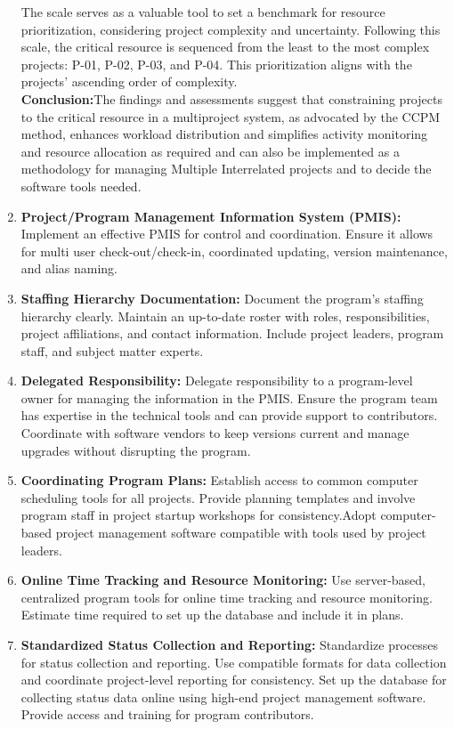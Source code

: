 \documentclass{llncs}
\begin{document}
\begin{enumerate}
\begin{figure}
                    \end{figure}
    The scale serves as a valuable tool to set a benchmark for resource prioritization, considering project complexity and uncertainty. Following this scale, the critical resource is sequenced from the least to the most complex projects: P-01, P-02, P-03, and P-04. This prioritization aligns with the projects' ascending order of complexity.~\cite{refpaper7} \\
    \textbf{Conclusion:}The findings and assessments suggest that constraining projects to the critical resource in a multiproject system, as advocated by the CCPM method, enhances workload distribution and simplifies activity monitoring and resource allocation as required and can also be implemented as a methodology for managing Multiple Interrelated projects and to decide the software tools needed.~\cite{refpaper7}
    \item\textbf{Project/Program Management Information System (PMIS):}
    Implement an effective PMIS for control and coordination.
    Ensure it allows for multi user check-out/check-in, coordinated updating, version maintenance, and alias naming.
    \item\textbf{Staffing Hierarchy Documentation:}
    Document the program’s staffing hierarchy clearly.
    Maintain an up-to-date roster with roles, responsibilities, project affiliations, and contact information.
    Include project leaders, program staff, and subject matter experts.
    \item \textbf{Delegated Responsibility:}
    Delegate responsibility to a program-level owner for managing the information in the PMIS. Ensure the program team has expertise in the technical tools and can provide support to contributors.
    Coordinate with software vendors to keep versions current and manage upgrades without disrupting the program.
    \item \textbf{Coordinating Program Plans:}
    Establish access to common computer scheduling tools for all projects.
    Provide planning templates and involve program staff in project startup workshops for consistency.Adopt computer-based project management software compatible with tools used by project leaders.
    \item \textbf{Online Time Tracking and Resource Monitoring:}
    Use server-based, centralized program tools for online time tracking and resource monitoring.
    Estimate time required to set up the database and include it in plans.
    \item \textbf{Standardized Status Collection and Reporting:}
    Standardize processes for status collection and reporting.
    Use compatible formats for data collection and coordinate project-level reporting for consistency.
    Set up the database for collecting status data online using high-end project management software.
    Provide access and training for program contributors.
\end{enumerate}
\end{document}

